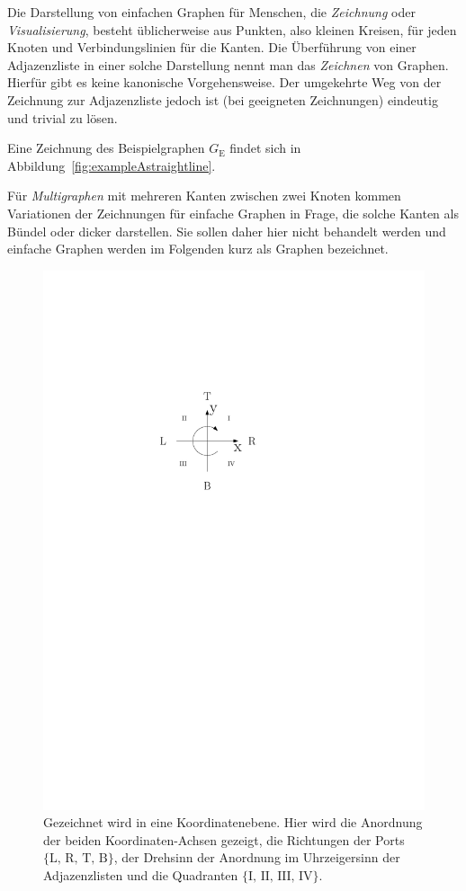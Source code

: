\documentclass[a4paper]{scrreprt}
\theoremstyle{definition}
\begin{document}
Die Darstellung von einfachen Graphen für Menschen, die \emph{Zeichnung} oder \emph{Visualisierung}, besteht üblicherweise aus Punkten, also kleinen Kreisen, für jeden Knoten und Verbindungslinien für die Kanten. Die Überführung von einer Adjazenzliste in einer solche Darstellung nennt man das \emph{Zeichnen} von Graphen. Hierfür gibt es keine kanonische Vorgehensweise. Der umgekehrte Weg von der Zeichnung zur Adjazenzliste jedoch ist (bei geeigneten Zeichnungen) eindeutig und trivial zu lösen.

Eine Zeichnung des Beispielgraphen $G_\text{E}$ findet sich in Abbildung~\ref{fig:exampleAstraightline}.

Für \emph{Multigraphen} mit mehreren Kanten zwischen zwei Knoten kommen Variationen der Zeichnungen für einfache Graphen in Frage, die solche Kanten als Bündel oder dicker darstellen. Sie sollen daher hier nicht behandelt werden und einfache Graphen werden im Folgenden kurz als Graphen bezeichnet.

\begin{figure}[h]
  \centering
  \includegraphics{koordinatengitter}
  \caption{Gezeichnet wird in eine Koordinatenebene. Hier wird die Anordnung der beiden Koordinaten-Achsen gezeigt, die Richtungen der Ports $\{\text{L, R, T, B}\}$, der Drehsinn der Anordnung im Uhrzeigersinn der Adjazenzlisten und die Quadranten $\{\text{I, II, III, IV}\}$.}
  \label{fig:coords}
\end{figure}
\end{document}
